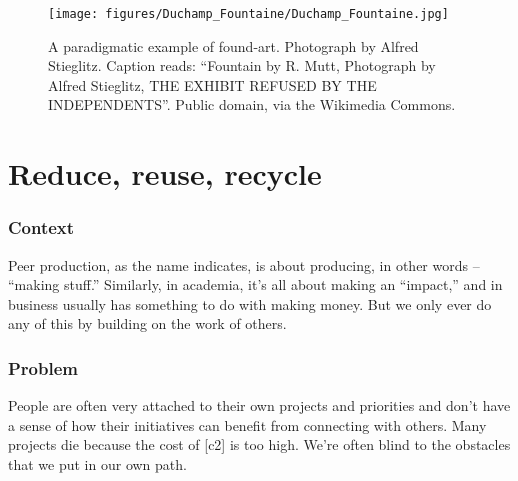 \begingroup \color{OliveGreen}

\begin{wrapfigure}{l}{.42\textwidth}
\vspace{-.4cm}
\begin{center}
\texttt{[image: figures/Duchamp\_Fountaine/Duchamp\_Fountaine.jpg]}
\end{center}
\caption{A paradigmatic example of found-art. Photograph by Alfred Stieglitz. Caption reads: ``Fountain by R. Mutt, Photograph by Alfred Stieglitz, THE EXHIBIT REFUSED BY THE INDEPENDENTS''. Public domain, via the Wikimedia Commons.\label{fountain}}
\vspace{-1cm}
\end{wrapfigure}

\section{Reduce, reuse, recycle} \label{sec:Use_or_make}

\subsubsection*{Context}
Peer production, as the name indicates, is about producing, in other words -- ``making stuff.''  Similarly, in academia, it's all about making an ``impact,'' and in business usually has something to do with making money.  But we only ever do any of this by building on the work of others.    

\subsubsection*{Problem}
People are often very attached to their own projects and priorities and don't have a sense of how their initiatives can benefit from connecting with others. Many projects die because the cost of  [c2] is too high.  We're often blind to the obstacles that we put in our own path.


